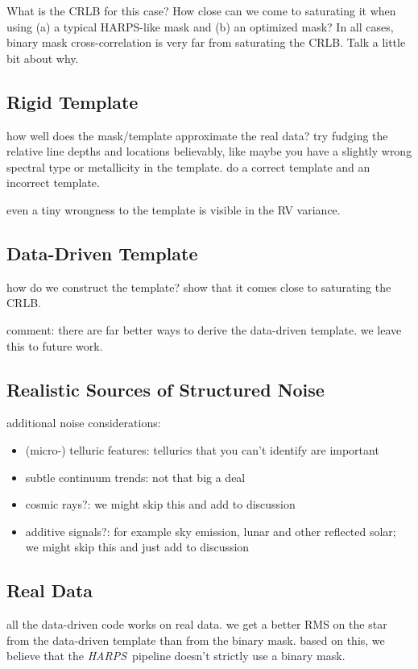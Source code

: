 \documentclass[modern]{aastex631}
\newcommand{\acronym}[1]{{\small{#1}}}
\newcommand{\project}[1]{\textsl{#1}}
\newcommand{\HARPS}{\project{\acronym{HARPS}}}
\begin{document}
What is the CRLB for this case? How close can we come to saturating it when using (a) a typical HARPS-like mask and (b) an optimized mask? In all cases, binary mask cross-correlation is very far from saturating the CRLB. Talk a little bit about why.

\subsection{Rigid Template}

how well does the mask/template approximate the real data? try fudging the relative line depths and locations believably, like maybe you have a slightly wrong spectral type or metallicity in the template. do a correct template and an incorrect template.

even a tiny wrongness to the template is visible in the RV variance.

\subsection{Data-Driven Template}

how do we construct the template? show that it comes close to saturating the CRLB.

comment: there are far better ways to derive the data-driven template. we leave this to future work.

\subsection{Realistic Sources of Structured Noise}

additional noise considerations:
\begin{itemize}
\item (micro-) telluric features: tellurics that you can't identify are important
\item subtle continuum trends: not that big a deal
\item cosmic rays?: we might skip this and add to discussion
\item additive signals?: for example sky emission, lunar and other reflected solar; we might skip this and just add to discussion
\end{itemize}

\subsection{Real Data}

all the data-driven code works on real data. we get a better RMS on the star from the data-driven template than from the binary mask. based on this, we believe that the \HARPS\ pipeline doesn't strictly use a binary mask.
\end{document}
